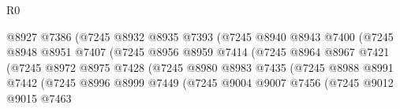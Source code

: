 \begin{lexlean}{R0}
\begin{coremodule}
                                        @8927
                                        @7386
                                        (@7245
                                          @8932
                                          @8935
                                          @7393
                                          (@7245
                                            @8940
                                            @8943
                                            @7400
                                            (@7245
                                              @8948
                                              @8951
                                              @7407
                                              (@7245
                                                @8956
                                                @8959
                                                @7414
                                                (@7245
                                                  @8964
                                                  @8967
                                                  @7421
                                                  (@7245
                                                    @8972
                                                    @8975
                                                    @7428
                                                    (@7245
                                                      @8980
                                                      @8983
                                                      @7435
                                                      (@7245
                                                        @8988
                                                        @8991
                                                        @7442
                                                        (@7245
                                                          @8996
                                                          @8999
                                                          @7449
                                                          (@7245
                                                            @9004
                                                            @9007
                                                            @7456
                                                            (@7245
                                                              @9012
                                                              @9015
                                                              @7463

\end{coremodule}
\end{lexlean}
